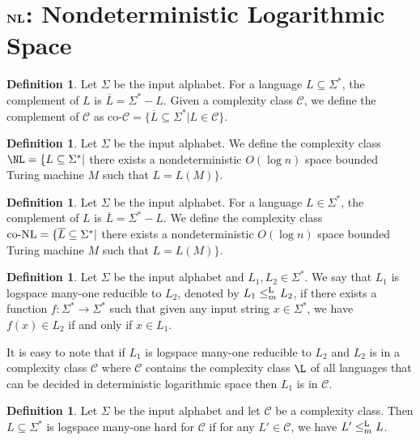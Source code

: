 \documentclass{amsbook}
\theoremstyle{definition}
\newtheorem{definition}[theorem]{Definition}
\theoremstyle{remark}
\numberwithin{section}{chapter}
\numberwithin{equation}{chapter}
\newcommand{\Lredn}{\leq^{\small{\rm L}}_m}
\newcommand{\boldNL}{\mbox{\rm \bf NL}}
\renewcommand{\coNL}{\mbox{\rm co-NL}}
\begin{document}
\section{$\boldNL$: Nondeterministic Logarithmic Space}
\begin{definition}\label{compdefinition}
Let $\Sigma $ be the input alphabet. For a language $L\subseteq\Sigma^*$, the complement of $L$ is $\overline{L}=\Sigma^*-L$. Given a complexity class $\mathcal{C}$, we define the complement of $\mathcal{C}$ as $\mbox{co-}\mathcal{C}=\{ \overline{L}\subseteq \Sigma ^*|L\in\mathcal{C}\}$.
\end{definition}

\begin{definition}\label{NLdefn}
Let $\Sigma $ be the input alphabet. We define the complexity class $\NL=\{ L\subseteq \Sigma ^*|$ there exists a nondeterministic $O(\log n)$ space bounded Turing machine $M$ such that $L=L(M)\}$.
\end{definition}

\begin{definition}
Let $\Sigma $ be the input alphabet. For a language $L\in\Sigma^*$, the complement of $L$ is $\overline{L}=\Sigma^*-L$. We define the complexity class $\coNL=\{ \overline{L}\subseteq \Sigma ^*|$ there exists a nondeterministic $O(\log n)$ space bounded Turing machine $M$ such that $L=L(M)\}$.
\end{definition}

\begin{definition}
Let $\Sigma$ be the input alphabet and $L_1,L_2\in\Sigma^*$. We say that $L_1$ is logspace many-one reducible to $L_2$, denoted by $L_1\Lredn L_2$, if there exists a function $f:\Sigma^*\rightarrow\Sigma^*$ such that given any input string $x\in\Sigma^*$, we have $f(x)\in L_2$ if and only if $x\in L_1$.
\end{definition}

It is easy to note that if $L_1$ is logspace many-one reducible to $L_2$ and $L_2$ is in a complexity class $\mathcal{C}$ where $\mathcal{C}$ contains the complexity class $\L$ of all languages that can be decided in deterministic logarithmic space then $L_1$ is in $\mathcal{C}$.

\begin{definition}
Let $\Sigma$ be the input alphabet and let $\mathcal{C}$ be a complexity class. Then $L\subseteq \Sigma^*$ is logspace many-one hard for $\mathcal{C}$ if for any $L'\in\mathcal{C}$, we have $L'\Lredn L$.
\end{definition}
\end{document}
